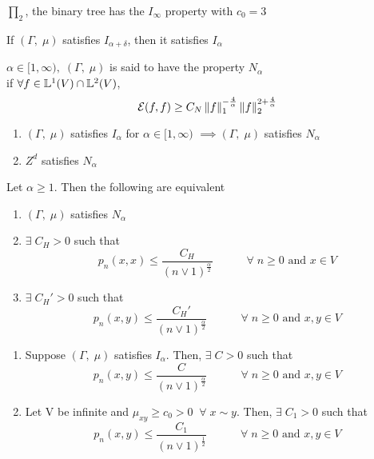 \documentclass[main]{subfiles}
\begin{document}
\ex
$\prod_2$, the binary tree has the $I_\infty$ property with $c_0 = 3$
\begin{obs}
	If $(\Gamma,\;\mu)$ satisfies $I_{\alpha+\delta}$, then it satisfies $I_\alpha$
\end{obs}
\begin{definition}
	$\alpha \in [1, \infty),\;(\Gamma,\;\mu)$ is said to have the property $N_\alpha$\\
	if $\forall f \in \mathbb L^1(V) \cap \mathbb L^2(V)$,
	\[\mathcal E(f,f) \geq C_N\left\lVert f\right\rVert_{1}^{-\frac{4}{\alpha}}\left\lVert f\right\rVert_{2}^{2+\frac{4}{\alpha}}\]
\end{definition}
\newpage
\begin{remark}[]
	\begin{enumerate}
		\item $(\Gamma,\;\mu)$ satisfies $I_\alpha$ for $\alpha \in [1, \infty)$
		      $\implies (\Gamma,\;\mu)$ satisfies $N_\alpha$
		\item $Z^d$ satisfies $N_\alpha$
	\end{enumerate}
\end{remark}
\begin{theorem}
	Let $\alpha \geq 1.$ Then the following are equivalent
	\begin{enumerate}
		\item $(\Gamma,\;\mu)$ satisfies $N_\alpha$
		\item $\exists\;C_H > 0$ such that
		      \[p_n(x,x) \leq \frac{C_H}{(n\vee1)^\frac{\alpha}{2}} \hspace{3em} \forall\;n \geq 0\text{ and } x \in V\]
		\item $\exists\;C_H' > 0$ such that
		      \[p_n(x,y) \leq \frac{C_H'}{(n\vee1)^\frac{\alpha}{2}} \hspace{3em} \forall\;n \geq 0\text{ and } x,y \in V\]
	\end{enumerate}
\end{theorem}
\begin{corollary}
	\label{cor:ubounds}
	\begin{enumerate}
		\item Suppose $(\Gamma,\;\mu)$ satisfies $I_\alpha.$ Then, $\exists\;C > 0$ such that
		      \[p_n(x,y) \leq \frac{C}{(n\vee1)^\frac{\alpha}{2}} \hspace{3em} \forall\;n \geq 0\text{ and } x,y \in V\]
		\item Let V be infinite and $\mu_{xy} \geq c_0 > 0\;\;\forall\;x \sim y.$ Then, $\exists\;C_1 > 0$ such that
		      \[p_n(x,y) \leq \frac{C_1}{(n\vee1)^\frac{1}{2}} \hspace{3em} \forall\;n \geq 0\text{ and } x,y \in V\]
	\end{enumerate}
\end{corollary}
\end{document}

